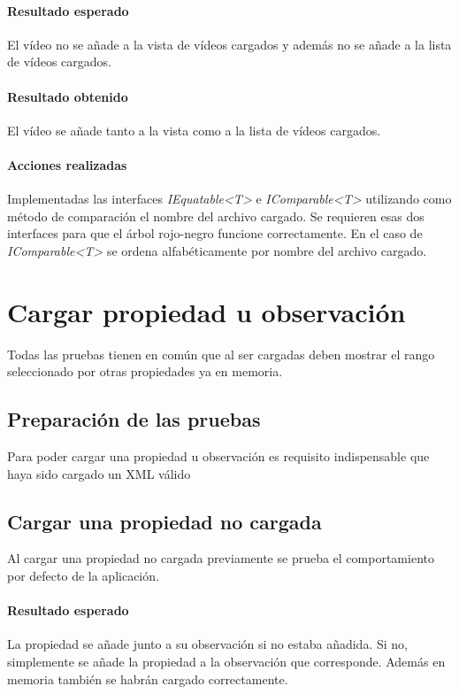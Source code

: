 \paragraph{Resultado esperado}
El v\'ideo no se a\~nade a la vista de v\'ideos
cargados y adem\'as no se a\~nade a la lista
de v\'ideos cargados.

\paragraph{Resultado obtenido}
El v\'ideo se a\~nade tanto a la vista como a la lista
de v\'ideos cargados.

\paragraph{Acciones realizadas}
Implementadas las interfaces \emph{IEquatable<T>} e \emph{IComparable<T>}
utilizando como m\'etodo de comparaci\'on el nombre del archivo cargado.
Se requieren esas dos interfaces para que el \'arbol rojo-negro funcione correctamente.
En el caso de \emph{IComparable<T>} se ordena alfab\'eticamente por nombre
del archivo cargado.

\section{Cargar propiedad u observaci\'on}
Todas las pruebas tienen en com\'un que al ser cargadas deben mostrar
el rango seleccionado por otras propiedades ya en memoria.
\subsection{Preparaci\'on de las pruebas}
Para poder cargar una propiedad u observaci\'on es requisito
indispensable que haya sido cargado un XML v\'alido

\subsection{Cargar una propiedad no cargada}
Al cargar una propiedad no cargada previamente
se prueba el comportamiento por defecto de la aplicaci\'on.

\paragraph{Resultado esperado}
La propiedad se a\~nade junto a su observaci\'on
si no estaba a\~nadida. Si no, simplemente se a\~nade la propiedad
a la observaci\'on que corresponde. Adem\'as en memoria tambi\'en
se habr\'an cargado correctamente.


